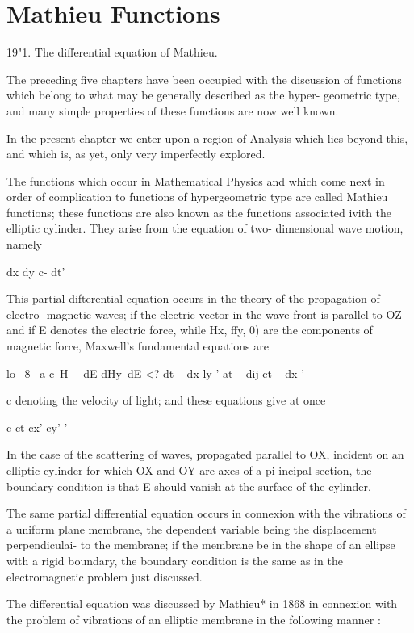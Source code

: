 \chapter{Mathieu Functions} 

19"1. The differential equation of Mathieu.

The preceding five chapters have been occupied with the discussion of
functions which belong to what may be generally described as the
hyper- geometric type, and many simple properties of these functions
are now well known.

In the present chapter we enter upon a region of Analysis which lies
beyond this, and which is, as yet, only very imperfectly explored.

The functions which occur in Mathematical Physics and which come next
in order of complication to functions of hypergeometric type are
called Mathieu functions; these functions are also known as the
functions associated ivith the elliptic cylinder. They arise from the
equation of two- dimensional wave motion, namely

dx dy c- dt'

This partial difterential equation occurs in the theory of the
propagation of electro- magnetic waves; if the electric vector in the
wave-front is parallel to OZ and if E denotes the electric force,
while Hx, ffy, 0) are the components of magnetic force, Maxwell's
fundamental equations are

lo \ 8 \ a c\ H \ \ dE dHy\ dE <? dt ~ dx ly ' at ~ dij ct ~ dx '

c denoting the velocity of light; and these equations give at once

c ct cx' cy' '

In the case of the scattering of waves, propagated parallel to OX,
incident on an elliptic cylinder for which OX and OY are axes of a
pi-incipal section, the boundary condition is that E should vanish at
the surface of the cylinder.

The same partial differential equation occurs in connexion with the
vibrations of a uniform plane membrane, the dependent variable being
the displacement perpendiculai- to the membrane; if the membrane be
in the shape of an ellipse with a rigid boundary, the boundary
condition is the same as in the electromagnetic problem just
discussed.

The differential equation was discussed by Mathieu* in 1868 in
connexion with the problem of vibrations of an elliptic membrane in
the following manner :

